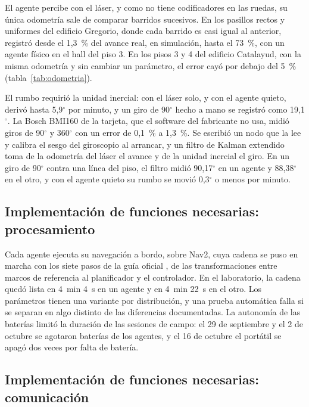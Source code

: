 El agente percibe con el láser, y como no tiene codificadores en las ruedas, su única odometría sale de comparar barridos sucesivos. En los pasillos rectos y uniformes del edificio Gregorio, donde cada barrido es casi igual al anterior, registró desde el 1,3~\% del avance real, en simulación, hasta el 73~\%, con un agente físico en el hall del piso 3. En los pisos 3 y 4 del edificio Catalayud, con la misma odometría y sin cambiar un parámetro, el error cayó por debajo del 5~\% (tabla~\ref{tab:odometria}).

El rumbo requirió la unidad inercial: con el láser solo, y con el agente quieto, derivó hasta 5,9$^\circ$ por minuto, y un giro de 90$^\circ$ hecho a mano se registró como 19,1$^\circ$. La Bosch BMI160 de la tarjeta, que el software del fabricante no usa, midió giros de 90$^\circ$ y 360$^\circ$ con un error de 0,1~\% a 1,3~\%. Se escribió un nodo que la lee y calibra el sesgo del giroscopio al arrancar, y un filtro de Kalman extendido toma de la odometría del láser el avance y de la unidad inercial el giro. En un giro de 90$^\circ$ contra una línea del piso, el filtro midió 90,17$^\circ$ en un agente y 88,38$^\circ$ en el otro, y con el agente quieto su rumbo se movió 0,3$^\circ$ o menos por minuto.

\subsection{Implementación de funciones necesarias: procesamiento}
\label{sec:nav2-ackermann}

Cada agente ejecuta su navegación a bordo, sobre Nav2, cuya cadena se puso en marcha con los siete pasos de la guía oficial \autocite{nav2setup}, de las transformaciones entre marcos de referencia al planificador y el controlador. En el laboratorio, la cadena quedó lista en 4~min 4~s en un agente y en 4~min 22~s en el otro. Los parámetros tienen una variante por distribución, y una prueba automática falla si se separan en algo distinto de las diferencias documentadas. La autonomía de las baterías limitó la duración de las sesiones de campo: el 29 de septiembre y el 2 de octubre se agotaron baterías de los agentes, y el 16 de octubre el portátil se apagó dos veces por falta de batería.

\subsection{Implementación de funciones necesarias: comunicación}
\label{sec:dos-vehiculos}
\label{sec:red}


